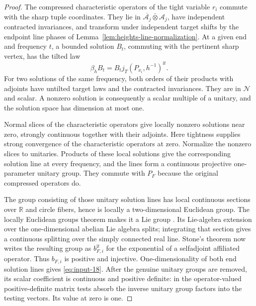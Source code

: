 \begin{proof}
The compressed characteristic operators of the tight variable $r_i$ commute
with the sharp tuple coordinates.  They lie in
$\overline{\mathcal A_j}\bar\otimes\mathcal A_j$, have independent
contracted invariances, and transform under independent target shifts by
the endpoint line phases of Lemma~\ref{lem:heights-line-normalization}.
At a given end and frequency $t$, a bounded solution $B_t$, commuting with
the pertinent sharp vertex, has the tilted law
\[
 \beta_h B_t=B_tj_T(P_{x_i},h^{-1})^{\mathrm it}.
\]
For two solutions of the same frequency, both orders of their products
with adjoints have untilted target laws and the contracted invariances.
They are in $\mathcal N$ and scalar.  A nonzero solution is consequently
a scalar multiple of a unitary, and the solution space has dimension at
most one.

Normal slices of the characteristic operators give locally nonzero
solutions near zero, strongly continuous together with their adjoints.
Here tightness supplies strong convergence of the characteristic operators
at zero.  Normalize the nonzero slices to unitaries.  Products of these
local solutions give the corresponding solution line at every frequency,
and the lines form a continuous projective one-parameter unitary group.
They commute with $P_F$ because the original compressed operators do.

The group consisting of those unitary solution lines has local continuous
sections over $\mathbb R$ and circle fibers, hence is locally a
two-dimensional Euclidean group.  The locally Euclidean groups theorem
makes it a Lie group \cite{Gleason1952,MontgomeryZippin1952}. Its Lie-algebra extension over the one-dimensional
abelian Lie algebra splits; integrating that section gives a continuous
splitting over the simply connected real line.  Stone's theorem \cite[Theorem~B]{Stone1932} now writes
the resulting group as $b_{F,i}^{\mathrm it}$ for the exponential of a
selfadjoint affiliated operator.  Thus $b_{F,i}$ is positive and injective.
One-dimensionality of both end solution lines gives
\eqref{eq:input-18}.  After the genuine unitary groups are removed, its
scalar coefficient is continuous and positive definite: in the
operator-valued positive-definite matrix tests absorb the inverse unitary
group factors into the testing vectors.  Its value at zero is one.


\end{proof}
